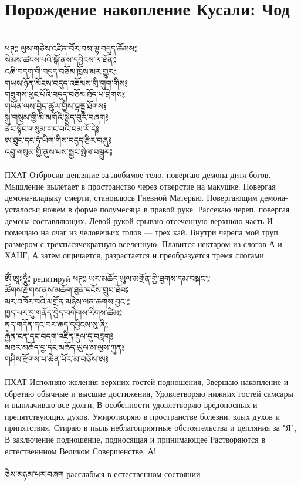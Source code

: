 \ru
\section{Порождение накопление Кусали: Чод}
\\
\ti
ཕཊ༔ ལུས་གཅེས་འཛིན་བོར་བས་ལྷ་བདུད་ཆོམས༔\\
སེམས་ཚངས་པའི་སྒོ་ནས་དབྱིངས་ལ་ཐོན༔\\
འཆི་བདག་གི་བདུད་བཅོམ་ཁྲོས་མར་གྱུར༔\\
གཡས་ཉོན་མོངས་བདུད་འཇོམས་གྲི་གུག་གིས༔\\
གཟུགས་ཕུང་པོའི་བདུད་བཅོམ་ཐོད་པ་བྲེགས༔\\
གཡོན་ལས་བྱེད་ཚུལ་གྱིས་བྷནྡྷ་ཐོགས༔\\
སྐུ་གསུམ་གྱི་མི་མགོའི་སྒྱེད་བུར་བཞག༔\\
ནང་སྟོང་གསུམ་གང་བའི་བམ་རོ་དེ༔\\
ཨ་ཐུང་དང་ཧཾ་ཡིག་གིས་བདུད་རྩིར་བཞུ༔\\
འབྲུ་གསུམ་གྱི་ནུས་པས་སྦྱང་སྤེལ་བསྒྱུར༔\\
\\
\ru
ПХАТ Отбросив цепляние за любимое тело, повергаю демона-дитя богов.
Мышление вылетает в пространство через отверстие на макушке.
Повергая демона-владыку смерти, становлюсь Гневной Матерью.
Повергающим демона-усталосьи ножем в форме полумесяца в правой руке.
Рассекаю череп, повергая демона-составляющих.
Левой рукой срываю отсеченную верхнюю часть
И помещаю на очаг из человечьих голов — трех кай.
Внутри черепа мой труп размером с трехтысячекратную вселенную.
Плавится нектаром из слогов А и ХАНГ,
А затем ощичается, разрастается и преобразуется тремя слогами\\
\\
\ti
ཨོཾ་ཨཱཿཧཱུྂ༔
\ru рецитируй
\newpage
\ti
ཕཊ༔ ཡར་མཆོད་ཡུལ་མགྲོན་གྱི་ཐུགས་དམ་བསྐང་༔\\
ཚོགས་རྫོགས་ནས་མཆོག་ཐུན་དངོས་གྲུབ་ཐོབ༔\\
མར་འཁོར་བའི་མགྲོན་མཉེས་ལན་ཆགས་བྱང་༔\\
ཁྱད་པར་དུ་གནོད་བྱེད་བགེགས་རིགས་ཚིམ༔\\
ནད་གདོན་དང་བར་ཆད་དབྱིངས་སུ་ཞི༔\\
རྐྱེན་ངན་དང་བདག་འཛིན་རྡུལ་དུ་བརླག༔\\
མཐར་མཆོད་བྱ་དང་མཆོད་ཡུལ་མ་ལུས་ཀུན༔\\
གཤིས་རྫོགས་པ་ཆེན་པོར་མ་བཅོས་ཨ༔\\
\\
\ru
ПХАТ Исполняю желения верхних гостей подношения,
Звершаю накопление и обретаю обычные и высшие достижения,
Удовлетворяю нижних гостей самсары и выплачиваю все долги,
В особенности удовлетворяю вредоносных и препятствующих духов,
Умиротворяю в пространстве болезни, злых духов и припятствия,
Стираю в пыль неблагоприятные обстоятельства и цепляния за "Я",
В заключение подношение, подносящая и принимающее
Растворяются в естественнном Великом Совершенстве. А!\\
\\
\ti
ཅེས་མཉམ་པར་བཞག \ru расслабься в естественном состоянии
